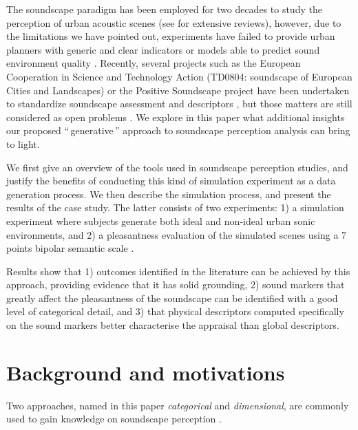 \documentclass[twoside,twocolumn]{article}
\begin{document}
The soundscape paradigm has been employed for two decades to study the perception of urban acoustic scenes (see \cite{kang2006urban,dubois2006cognitive,aletta2016soundscape} for extensive reviews), however, due to the limitations we have pointed out, experiments have failed to provide  urban planners with generic and clear indicators or models able to predict sound environment quality \cite{schulte-fortkamp_soundscape:_2007, aletta2016soundscape}. Recently, several projects such as the European Cooperation in Science and Technology Action (TD0804: soundscape of European Cities and Landscapes) or the Positive Soundscape project \cite{davies_perception_2013} have been undertaken to standardize soundscape assessment and descriptors \cite{schulte2013soundscape}, but those matters are still considered as open problems \cite{ribeiro2013heart}. We explore in this paper what additional insights our proposed ``\,generative\,'' approach to soundscape perception analysis can bring to light.

We first give an overview of the tools used in soundscape perception studies, and justify the benefits of conducting this kind of simulation experiment as a data generation process. We then describe the simulation process, and present the results of the case study. The latter consists of two experiments: 1) a simulation experiment where subjects generate both ideal and non-ideal urban sonic environments, and 2) a pleasantness evaluation of the simulated scenes using a 7 points bipolar semantic scale .

Results show that  1) outcomes identified in the literature \cite{guastavino_categorization_2007} can be achieved by this approach, providing evidence that it has solid grounding, 2) sound markers that greatly affect the pleasantness of the soundscape can be identified with a good level of categorical detail, and 3) that physical descriptors computed specifically on the sound markers better characterise the appraisal than global descriptors.

\section{Background and motivations}
\label{statoftheart}

Two approaches, named in this paper \textit{categorical} and \textit{dimensional}, are commonly used to gain knowledge on soundscape perception .
\end{document}
